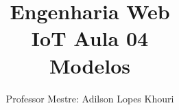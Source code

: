 \documentclass[compress, hyperref={pdfpagelayout=SinglePage}]{beamer}
\title[IoT - Aula 04]{Engenharia Web \\ IoT Aula 04 \\ Modelos}
\author{Professor Mestre: Adilson Lopes Khouri}
\begin{document}
	\begin{frame}
		\titlepage
	\end{frame}
	
	
	
	
	
	
					
	

	
	
\end{document}

